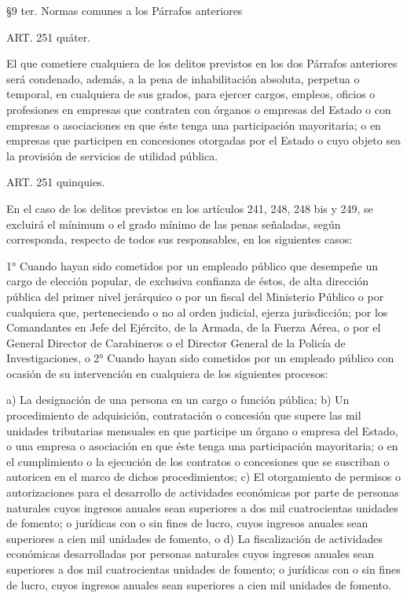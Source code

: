    §9 ter. Normas comunes a los Párrafos anteriores






   
    ART. 251 quáter.

    El que cometiere cualquiera de los delitos previstos en los dos Párrafos anteriores será condenado, además, a la pena de inhabilitación absoluta, perpetua o temporal, en cualquiera de sus grados, para ejercer cargos, empleos, oficios o profesiones en empresas que contraten con órganos o empresas del Estado o con empresas o asociaciones en que éste tenga una participación mayoritaria; o en empresas que participen en concesiones otorgadas por el Estado o cuyo objeto sea la provisión de servicios de utilidad pública.

   
    ART. 251 quinquies.

    En el caso de los delitos previstos en los artículos 241, 248, 248 bis y 249, se excluirá el mínimum o el grado mínimo de las penas señaladas, según corresponda, respecto de todos sus responsables, en los siguientes casos:
   
    1° Cuando hayan sido cometidos por un empleado público que desempeñe un cargo de elección popular, de exclusiva confianza de éstos, de alta dirección pública del primer nivel jerárquico o por un fiscal del Ministerio Público o por cualquiera que, perteneciendo o no al orden judicial, ejerza jurisdicción; por los Comandantes en Jefe del Ejército, de la Armada, de la Fuerza Aérea, o por el General Director de Carabineros o el Director General de la Policía de Investigaciones, o
    2° Cuando hayan sido cometidos por un empleado público con ocasión de su intervención en cualquiera de los siguientes procesos:
   
    a) La designación de una persona en un cargo o función pública;
    b) Un procedimiento de adquisición, contratación o concesión que supere las mil unidades tributarias mensuales en que participe un órgano o empresa del Estado, o una empresa o asociación en que éste tenga una participación mayoritaria; o en el cumplimiento o la ejecución de los contratos o concesiones que se suscriban o autoricen en el marco de dichos procedimientos;
    c) El otorgamiento de permisos o autorizaciones para el desarrollo de actividades económicas por parte de personas naturales cuyos ingresos anuales sean superiores a dos mil cuatrocientas unidades de fomento; o jurídicas con o sin fines de lucro, cuyos ingresos anuales sean superiores a cien mil unidades de fomento, o
    d) La fiscalización de actividades económicas desarrolladas por personas naturales cuyos ingresos anuales sean superiores a dos mil cuatrocientas unidades de fomento; o jurídicas con o sin fines de lucro, cuyos ingresos anuales sean superiores a cien mil unidades de fomento.
   

